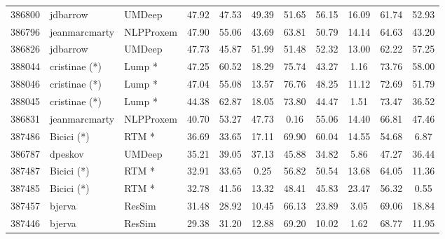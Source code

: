 \documentclass[11pt,a4paper]{article}
\begin{document}
\begin{table*}[htp!!]
\begin{center}
\begin{tabu}{|HHl| *{8}{S[table-format=2.2]|}}
386800 & jdbarrow & UMDeep \cite{barrow-peskov:2017:SemEval} & 47.92 & 47.53 & 49.39 & 51.65 & 56.15 & 16.09 & 61.74 & 52.93\\ 

386796 & jeanmarcmarty & NLPProxem & 47.90 & 55.06 & 43.69 & 63.81 & 50.79 & 14.14 & 64.63 & 43.20\\ 

386826 & jdbarrow & UMDeep \cite{barrow-peskov:2017:SemEval} & 47.73 & 45.87 & 51.99 & 51.48 & 52.32 & 13.00 & 62.22 & 57.25\\ 

388044 & cristinae (*) & Lump \cite{espanabonet-barroncedeno:2017:SemEval}* & 47.25 & 60.52 & 18.29 & 75.74 & 43.27 & 1.16 & 73.76 & 58.00\\ 

388046 & cristinae (*) & Lump \cite{espanabonet-barroncedeno:2017:SemEval}* & 47.04 & 55.08 & 13.57 & 76.76 & 48.25 & 11.12 & 72.69 & 51.79\\ 

388045 & cristinae (*) & Lump \cite{espanabonet-barroncedeno:2017:SemEval}* & 44.38 & 62.87 & 18.05 & 73.80 & 44.47 & 1.51 & 73.47 & 36.52\\ 

386831 & jeanmarcmarty & NLPProxem & 40.70 & 53.27 & 47.73 & 0.16 & 55.06 & 14.40 & 66.81 & 47.46\\ 

387486 & Bicici (*) & RTM \cite{biccici:2017:SemEval}* & 36.69 & 33.65 & 17.11 & 69.90 & 60.04 & 14.55 & 54.68 & 6.87\\ 

386787 & dpeskov & UMDeep \cite{barrow-peskov:2017:SemEval} & 35.21 & 39.05 & 37.13 & 45.88 & 34.82 & 5.86 & 47.27 & 36.44\\ 

387487 & Bicici (*) & RTM \cite{biccici:2017:SemEval}* & 32.91 & 33.65 & 0.25 & 56.82 & 50.54 & 13.68 & 64.05 & 11.36\\ 

387485 & Bicici (*) & RTM \cite{biccici:2017:SemEval}* & 32.78 & 41.56 & 13.32 & 48.41 & 45.83 & 23.47 & 56.32 & 0.55\\ 

387457 & bjerva & ResSim \cite{bjerva-ostling:2017:SemEval} & 31.48 & 28.92 & 10.45 & 66.13 & 23.89 & 3.05 & 69.06 & 18.84\\ 

387446 & bjerva & ResSim \cite{bjerva-ostling:2017:SemEval} & 29.38 & 31.20 & 12.88 & 69.20 & 10.02 & 1.62 & 68.77 & 11.95\\ 


\end{tabu}
\end{center}
\end{table*}
\end{document}
